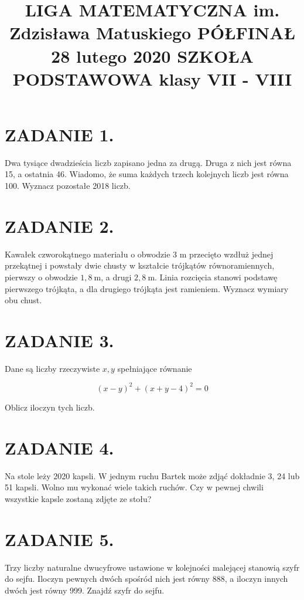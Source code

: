 \documentclass[10pt]{article}
\title{LIGA MATEMATYCZNA im. Zdzisława Matuskiego PÓŁFINAŁ 28 lutego 2020 SZKOŁA PODSTAWOWA klasy VII - VIII }
\author{}
\date{}
\begin{document}
\maketitle
\section*{ZADANIE 1.}
Dwa tysiące dwadzieścia liczb zapisano jedna za drugą. Druga z nich jest równa 15, a ostatnia 46. Wiadomo, że suma każdych trzech kolejnych liczb jest równa 100. Wyznacz pozostałe 2018 liczb.

\section*{ZADANIE 2.}
Kawałek czworokątnego materiału o obwodzie 3 m przecięto wzdłuż jednej przekątnej i powstały dwie chusty w kształcie trójkątów równoramiennych, pierwszy o obwodzie \(1,8 \mathrm{~m}\), a drugi \(2,8 \mathrm{~m}\). Linia rozcięcia stanowi podstawę pierwszego trójkąta, a dla drugiego trójkąta jest ramieniem. Wyznacz wymiary obu chust.

\section*{ZADANIE 3.}
Dane są liczby rzeczywiste \(x, y\) spełniające równanie

\[
(x-y)^{2}+(x+y-4)^{2}=0
\]

Oblicz iloczyn tych liczb.

\section*{ZADANIE 4.}
Na stole leży 2020 kapsli. W jednym ruchu Bartek może zdjąć dokładnie 3, 24 lub 51 kapsli. Wolno mu wykonać wiele takich ruchów. Czy w pewnej chwili wszystkie kapsle zostaną zdjęte ze stołu?

\section*{ZADANIE 5.}
Trzy liczby naturalne dwucyfrowe ustawione w kolejności malejącej stanowią szyfr do sejfu. Iloczyn pewnych dwóch spośród nich jest równy 888, a iloczyn innych dwóch jest równy 999. Znajdź szyfr do sejfu.
\end{document}
